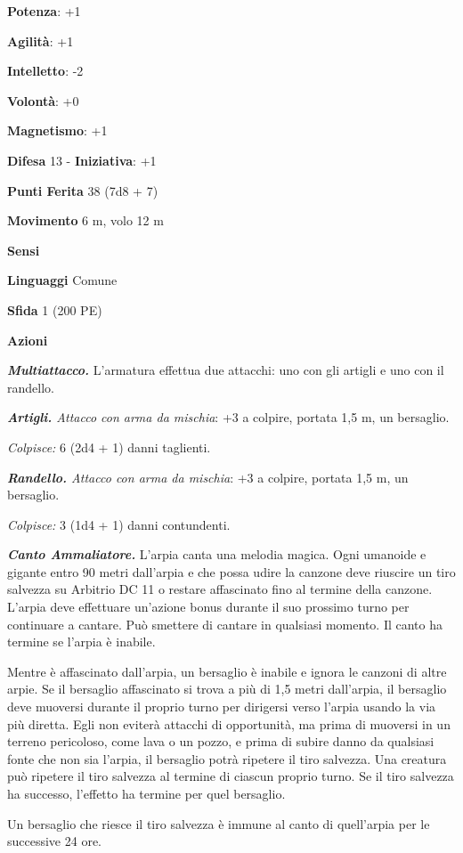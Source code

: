 \begin{multicols}{2}
\textbf{Potenza}: +1

\textbf{Agilità}: +1

\textbf{Intelletto}: -2

\textbf{Volontà}: +0

\textbf{Magnetismo}: +1

\textbf{Difesa} 13 - \textbf{Iniziativa}: +1

\textbf{Punti Ferita} 38 (7d8 + 7)

\textbf{Movimento} 6 m, volo 12 m

\textbf{Sensi} 

\textbf{Linguaggi} Comune

\textbf{Sfida} 1 (200 PE)

\textbf{Azioni}

\emph{\textbf{Multiattacco.}} L'armatura effettua due attacchi: uno con
gli artigli e uno con il randello.

\emph{\textbf{Artigli.} Attacco con arma da mischia}: +3 a colpire,
portata 1,5 m, un bersaglio.

\emph{Colpisce:} 6 (2d4 + 1) danni taglienti.

\emph{\textbf{Randello.} Attacco con arma da mischia}: +3 a colpire,
portata 1,5 m, un bersaglio.

\emph{Colpisce:} 3 (1d4 + 1) danni contundenti.

\emph{\textbf{Canto Ammaliatore.}} L'arpia canta una melodia magica.
Ogni umanoide e gigante entro 90 metri dall'arpia e che possa udire la
canzone deve riuscire un tiro salvezza su Arbitrio DC 11 o restare
affascinato fino al termine della canzone. L'arpia deve effettuare
un'azione bonus durante il suo prossimo turno per continuare a cantare.
Può smettere di cantare in qualsiasi momento. Il canto ha termine se
l'arpia è inabile.

Mentre è affascinato dall'arpia, un bersaglio è inabile e ignora le
canzoni di altre arpie. Se il bersaglio affascinato si trova a più di
1,5 metri dall'arpia, il bersaglio deve muoversi durante il proprio
turno per dirigersi verso l'arpia usando la via più diretta. Egli non
eviterà attacchi di opportunità, ma prima di muoversi in un terreno
pericoloso, come lava o un pozzo, e prima di subire danno da qualsiasi
fonte che non sia l'arpia, il bersaglio potrà ripetere il tiro salvezza.
Una creatura può ripetere il tiro salvezza al termine di ciascun proprio
turno. Se il tiro salvezza ha successo, l'effetto ha termine per quel
bersaglio.

Un bersaglio che riesce il tiro salvezza è immune al canto di
quell'arpia per le successive 24 ore.


\end{multicols}
